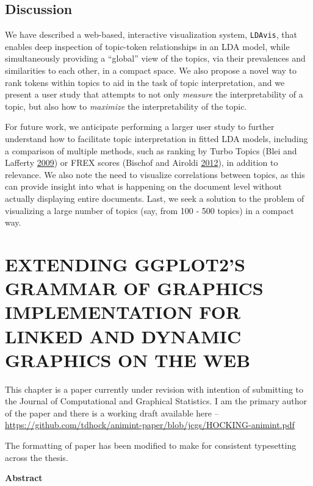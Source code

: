 \documentclass[12pt,]{isuthesis}
\begin{document}
\section{Discussion}\label{section:futurework}

We have described a web-based, interactive visualization system,
\texttt{LDAvis}, that enables deep inspection of topic-token
relationships in an LDA model, while simultaneously providing a
``global'' view of the topics, via their prevalences and similarities to
each other, in a compact space. We also propose a novel way to rank
tokens within topics to aid in the task of topic interpretation, and we
present a user study that attempts to not only \emph{measure} the
interpretability of a topic, but also how to \emph{maximize} the
interpretability of the topic.

For future work, we anticipate performing a larger user study to further
understand how to facilitate topic interpretation in fitted LDA models,
including a comparison of multiple methods, such as ranking by Turbo
Topics (Blei and Lafferty \protect\hyperlink{ref-Blei-2009}{2009}) or
FREX scores (Bischof and Airoldi \protect\hyperlink{ref-Bischof}{2012}),
in addition to relevance. We also note the need to visualize
correlations between topics, as this can provide insight into what is
happening on the document level without actually displaying entire
documents. Last, we seek a solution to the problem of visualizing a
large number of topics (say, from 100 - 500 topics) in a compact way.

\chapter{EXTENDING GGPLOT2'S GRAMMAR OF GRAPHICS IMPLEMENTATION FOR LINKED AND DYNAMIC GRAPHICS ON THE WEB} \label{sec:animint}

This chapter is a paper currently under revision with intention of
submitting to the Journal of Computational and Graphical Statistics. I
am the primary author of the paper and there is a working draft
available here --
\url{https://github.com/tdhock/animint-paper/blob/jcgs/HOCKING-animint.pdf}

The formatting of paper has been modified to make for consistent
typesetting across the thesis.

\begin{center}
  \begin{Large}
    \textbf{Abstract}
  \end{Large}
\end{center}
\end{document}
